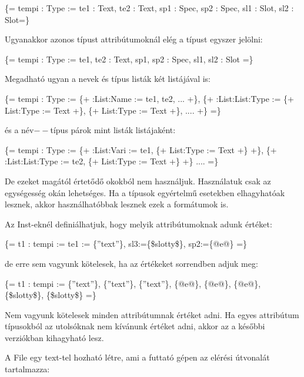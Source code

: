 \{= tempi : Type := te1 : Text, te2 : Text, sp1 : Spec, sp2 : Spec, sl1 : Slot, sl2 : Slot=\}

Ugyanakkor azonos típust attribútumoknál elég a típust egyszer jelölni:

\{= tempi : Type := te1, te2 : Text, sp1, sp2 : Spec, sl1, sl2 : Slot =\}

Megadható ugyan a nevek és típus listák két listájával is:

\{= tempi : Type := \{+ :List:Name := te1, te2, ... +\}, \{+ :List:List:Type := \{+ List:Type := Text +\}, \{+ List:Type := Text +\}, .... +\} =\}

és a név$--$típus párok mint listák listájaként:

\{= tempi : Type := \{+ :List:Vari := te1, \{+ List:Type := Text +\} +\}, \{+ :List:List:Type := te2, \{+ List:Type := Text +\} +\} .... =\}

De ezeket magától értetődő okokból nem használjuk.
Használatuk csak az egységesség okán lehetséges.
Ha a típusok egyértelmű esetekben elhagyhatóak lesznek, akkor használhatóbbak lesznek ezek a formátumok is.

Az Inst-eknél definiálhatjuk, hogy melyik attribútumoknak adunk értéket:

\{= t1 : tempi := te1 := \{”text”\}, sl3:=\{\$slotty\$\}, sp2:=\{@e@\} =\}

de erre sem vagyunk kötelesek, ha az értékeket sorrendben adjuk meg:

\{= t1 : tempi := \{”text”\}, \{”text”\}, \{”text”\}, \{@e@\}, \{@e@\}, \{@e@\}, \{\$slotty\$\}, \{\$slotty\$\} =\}

Nem vagyunk kötelesek minden attribútumnak értéket adni.
Ha egyes attribútum típusokból az utolsóknak nem kívánunk értéket adni, akkor az a későbbi verziókban kihagyható lesz.

A File egy text-tel hozható létre, ami a futtató gépen az elérési útvonalát tartalmazza:

